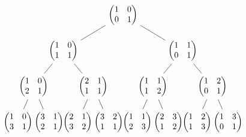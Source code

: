 \documentclass{article}
\begin{document}
 
$$\begin{tikzpicture}[level distance=15mm, 
                    level 1/.style={sibling distance=50mm},
                    level 2/.style={sibling distance=25mm},
                    level 3/.style={sibling distance=13mm}]
  \node {\(\begin{pmatrix}1 & 0 \\ 0 & 1\end{pmatrix}\)}
    child {
      node {\(\begin{pmatrix}1 & 0 \\ 1 & 1\end{pmatrix}\)} 
      child {
        node {\(\begin{pmatrix}1 & 0 \\ 2 & 1\end{pmatrix}\)}
        child {node {\(\begin{pmatrix}1 & 0 \\ 3 & 1\end{pmatrix}\)}}
        child {node {\(\begin{pmatrix}3 & 1 \\ 2 & 1\end{pmatrix}\)}}
      }
      child {
        node {\(\begin{pmatrix}2 & 1 \\ 1 & 1\end{pmatrix}\)}
        child {node {\(\begin{pmatrix}2 & 1 \\ 3 & 2\end{pmatrix}\)}}
        child {node {\(\begin{pmatrix}3 & 2 \\ 1 & 1\end{pmatrix}\)}}
      }
    }
    child {
      node {\(\begin{pmatrix}1 & 1 \\ 0 & 1\end{pmatrix}\)}
      child {
        node {\(\begin{pmatrix}1 & 1 \\ 1 & 2\end{pmatrix}\)}
        child {node {\(\begin{pmatrix}1 & 1 \\ 2 & 3\end{pmatrix}\)}}
        child {node {\(\begin{pmatrix}2 & 3 \\ 1 & 2\end{pmatrix}\)}}
      }
      child {
        node {\(\begin{pmatrix}1 & 2 \\ 0 & 1\end{pmatrix}\)}
        child {node {\(\begin{pmatrix}1 & 2 \\ 1 & 3\end{pmatrix}\)}}
        child {node {\(\begin{pmatrix}1 & 3 \\ 0 & 1\end{pmatrix}\)}}
      } 
    };
\end{tikzpicture}$$
 
\end{document}

